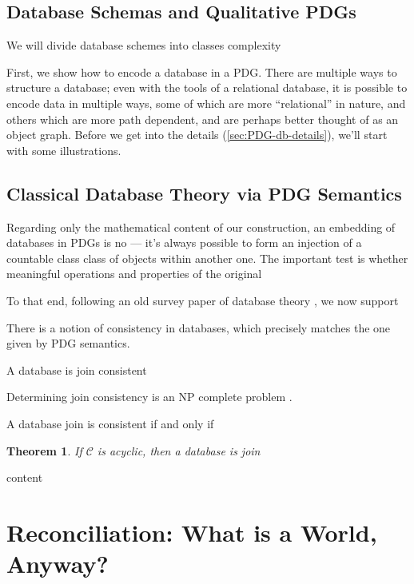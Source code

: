 \documentclass{article}
\theoremstyle{plain}
\newtheorem{theorem}{Theorem}%
\theoremstyle{definition}
\theoremstyle{remark}
\newcommand{\Cols}{\mathcal C}%
\begin{document}
\subsection{Database Schemas and Qualitative PDGs}

We will divide database schemes into classes complexity



First, we show how to encode a database in a PDG. There are multiple ways to structure a database; even with the tools of a relational database, it is possible to encode data in multiple ways, some of which are more ``relational'' in nature, and others which are more path dependent, and are perhaps better thought of as an object graph. 
Before we get into the details (\cref{sec:PDG-db-details}), we'll start with some illustrations. 


\subsection{Classical Database Theory via PDG Semantics}
Regarding only the mathematical content of our construction, an embedding of databases in PDGs is no --- it's always possible to form an injection of a countable class class of objects within another one. The important test is whether meaningful operations and properties of the original 

To that end, following an old survey paper of database theory \cite{fagin1986theory}, we now support 


There is a notion of consistency in databases, which precisely matches the one given by PDG semantics.
\begin{defn}
	A database is join consistent
\end{defn}

Determining join consistency is an NP complete problem \cite{HLY in fagin1986theory}.

\begin{defn}
	A database join is consistent if and only if
\end{defn}
\begin{theorem}
	If $\Cols$ is acyclic, then a database is join
\end{theorem}

\begin{defn}
	content
\end{defn}


\section{Reconciliation: What is a World, Anyway?} \label{sec:possible-world}
\end{document}

